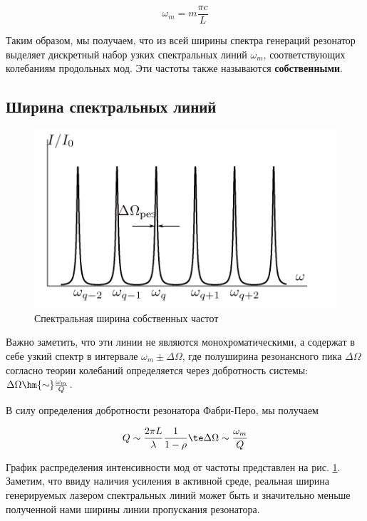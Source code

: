 \documentclass[12pt]{kiarticle}
\begin{document}
\begin{equation}\label{omega_m}
\omega_m = m \dfrac{\pi c}{L}
\end{equation}

Таким образом, мы получаем, что из всей ширины спектра генераций резонатор выделяет дискретный набор узких спектральных линий $ \omega_m $, соответствующих колебаниям продольных мод. Эти частоты также называются \textbf{собственными}. 

\subsection{Ширина спектральных линий}

\begin{figure} 
	\includegraphics[width=\linewidth]{piks.png}
	\caption{Спектральная ширина собственных частот}
	\label{piks}
\end{figure}

Важно заметить, что эти линии не являются монохроматическими, а содержат в себе узкий спектр в интервале $ \omega_m \pm \Delta \Omega $, где полуширина резонансного пика $ \Delta \Omega $ согласно теории колебаний определяется через добротность системы: $ \Delta \Omega \hm{\sim} \frac{\omega_m}{Q} $. 

В силу определения добротности резонатора Фабри-Перо, мы получаем 

\begin{equation}\label{}
Q \sim \dfrac{2\pi L}{\lambda} \dfrac{1}{1 - \rho} \te \Delta \Omega \sim \dfrac{\omega_m}{Q}
\end{equation}

График распределения интенсивности мод от частоты представлен на рис. \ref{piks}. Заметим, что ввиду наличия усиления в активной среде, реальная ширина генерируемых лазером спектральных линий может быть
и значительно меньше полученной нами ширины линии пропускания резонатора. 
\end{document}

